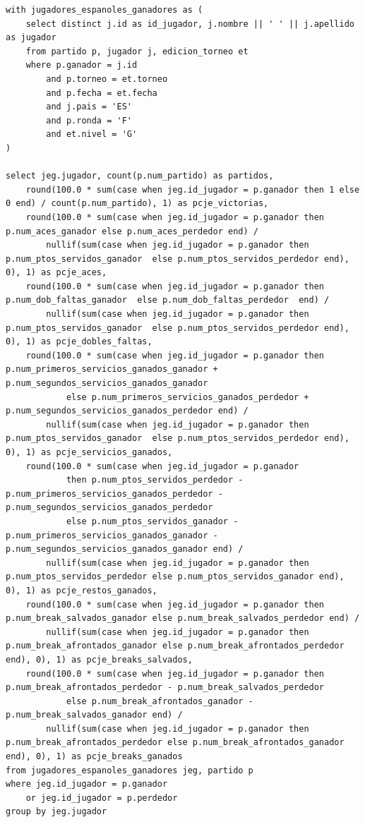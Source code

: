 \documentclass[11pt]{opticajnl}
\begin{document}
\begin{verbatim}
with jugadores_espanoles_ganadores as (
    select distinct j.id as id_jugador, j.nombre || ' ' || j.apellido as jugador
    from partido p, jugador j, edicion_torneo et 
    where p.ganador = j.id 
        and p.torneo = et.torneo 
        and p.fecha = et.fecha
        and j.pais = 'ES'
        and p.ronda = 'F'
        and et.nivel = 'G'
)

select jeg.jugador, count(p.num_partido) as partidos,
    round(100.0 * sum(case when jeg.id_jugador = p.ganador then 1 else 0 end) / count(p.num_partido), 1) as pcje_victorias, 
    round(100.0 * sum(case when jeg.id_jugador = p.ganador then p.num_aces_ganador else p.num_aces_perdedor end) / 
        nullif(sum(case when jeg.id_jugador = p.ganador then p.num_ptos_servidos_ganador  else p.num_ptos_servidos_perdedor end), 0), 1) as pcje_aces, 
    round(100.0 * sum(case when jeg.id_jugador = p.ganador then p.num_dob_faltas_ganador  else p.num_dob_faltas_perdedor  end) / 
        nullif(sum(case when jeg.id_jugador = p.ganador then p.num_ptos_servidos_ganador  else p.num_ptos_servidos_perdedor end), 0), 1) as pcje_dobles_faltas, 
    round(100.0 * sum(case when jeg.id_jugador = p.ganador then p.num_primeros_servicios_ganados_ganador + p.num_segundos_servicios_ganados_ganador 
            else p.num_primeros_servicios_ganados_perdedor + p.num_segundos_servicios_ganados_perdedor end) / 
        nullif(sum(case when jeg.id_jugador = p.ganador then p.num_ptos_servidos_ganador  else p.num_ptos_servidos_perdedor end), 0), 1) as pcje_servicios_ganados, 
    round(100.0 * sum(case when jeg.id_jugador = p.ganador 
            then p.num_ptos_servidos_perdedor - p.num_primeros_servicios_ganados_perdedor - p.num_segundos_servicios_ganados_perdedor 
            else p.num_ptos_servidos_ganador - p.num_primeros_servicios_ganados_ganador - p.num_segundos_servicios_ganados_ganador end) / 
        nullif(sum(case when jeg.id_jugador = p.ganador then p.num_ptos_servidos_perdedor else p.num_ptos_servidos_ganador end), 0), 1) as pcje_restos_ganados,
    round(100.0 * sum(case when jeg.id_jugador = p.ganador then p.num_break_salvados_ganador else p.num_break_salvados_perdedor end) / 
        nullif(sum(case when jeg.id_jugador = p.ganador then p.num_break_afrontados_ganador else p.num_break_afrontados_perdedor end), 0), 1) as pcje_breaks_salvados, 
    round(100.0 * sum(case when jeg.id_jugador = p.ganador then p.num_break_afrontados_perdedor - p.num_break_salvados_perdedor 
            else p.num_break_afrontados_ganador - p.num_break_salvados_ganador end) / 
        nullif(sum(case when jeg.id_jugador = p.ganador then p.num_break_afrontados_perdedor else p.num_break_afrontados_ganador end), 0), 1) as pcje_breaks_ganados
from jugadores_espanoles_ganadores jeg, partido p
where jeg.id_jugador = p.ganador 
	or jeg.id_jugador = p.perdedor
group by jeg.jugador
\end{verbatim}
\end{document}
